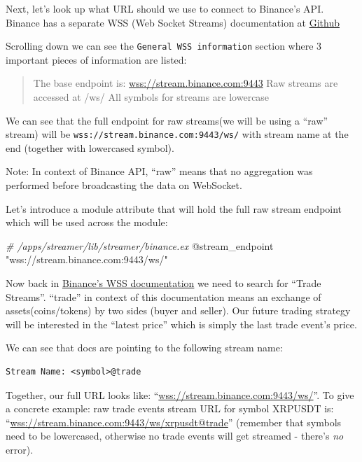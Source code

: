 \documentclass[
]{book}
\newenvironment{Shaded}{\begin{snugshade}}{\end{snugshade}}
\newcommand{\CommentTok}[1]{\textcolor[rgb]{0.56,0.35,0.01}{\textit{#1}}}
\newcommand{\OtherTok}[1]{\textcolor[rgb]{0.56,0.35,0.01}{#1}}
\newcommand{\StringTok}[1]{\textcolor[rgb]{0.31,0.60,0.02}{#1}}
\begin{document}
Next, let's look up what URL should we use to connect to Binance's API. Binance has a separate WSS (Web Socket Streams) documentation at \href{https://github.com/binance/binance-spot-api-docs/blob/master/web-socket-streams.md}{Github}

Scrolling down we can see the \texttt{General\ WSS\ information} section where 3 important pieces of information are listed:

\begin{quote}
The base endpoint is: \url{wss://stream.binance.com:9443}
Raw streams are accessed at /ws/
All symbols for streams are lowercase
\end{quote}

We can see that the full endpoint for raw streams(we will be using a ``raw'' stream) will be \texttt{wss://stream.binance.com:9443/ws/} with stream name at the end (together with lowercased symbol).

Note: In context of Binance API, ``raw'' means that no aggregation was performed before broadcasting the data on WebSocket.

Let's introduce a module attribute that will hold the full raw stream endpoint which will be used across the module:

\begin{Shaded}
\begin{Highlighting}[]
\CommentTok{\# /apps/streamer/lib/streamer/binance.ex}
\OtherTok{@stream\_endpoint} \StringTok{"wss://stream.binance.com:9443/ws/"}
\end{Highlighting}
\end{Shaded}

Now back in \href{https://github.com/binance/binance-spot-api-docs/blob/master/web-socket-streams.md}{Binance's WSS documentation} we need to search for ``Trade Streams''. ``trade'' in context of this documentation means an exchange of assets(coins/tokens) by two sides (buyer and seller). Our future trading strategy will be interested in the ``latest price'' which is simply the last trade event's price.

We can see that docs are pointing to the following stream name:

\begin{verbatim}
Stream Name: <symbol>@trade
\end{verbatim}

Together, our full URL looks like: ``\url{wss://stream.binance.com:9443/ws/}\citet{trade}''.
To give a concrete example: raw trade events stream URL for symbol XRPUSDT is:
``\url{wss://stream.binance.com:9443/ws/xrpusdt@trade}'' (remember that symbols need to be lowercased, otherwise no trade events will get streamed - there's \emph{no} error).
\end{document}
